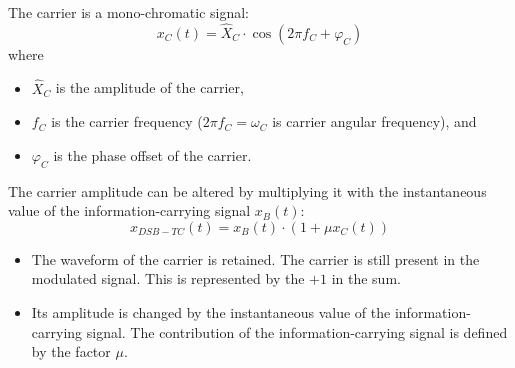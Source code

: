 \begin{refsection}
The carrier is a mono-chromatic signal:
\begin{equation}
	x_C(t) = \hat{X}_C \cdot \cos\left(2\pi f_C + \varphi_C\right)
\end{equation}
where
\begin{itemize}
	\item $\hat{X}_C$ is the amplitude of the carrier,
	\item $f_C$ is the carrier frequency ($2\pi f_C = \omega_C$ is carrier angular frequency), and
	\item $\varphi_C$ is the phase offset of the carrier.
\end{itemize}

The carrier amplitude can be altered by multiplying it with the instantaneous value of the information-carrying signal $x_B(t)$:
\begin{equation}
	x_{DSB-TC}(t) = x_B(t) \cdot \left(1 + \mu x_C(t)\right)
	\label{eq:ch05:amdsb_timedomain}
\end{equation}
\begin{itemize}
	\item The waveform of the carrier is retained. The carrier is still present in the modulated signal. This is represented by the $+1$ in the sum.
	\item Its amplitude is changed by the instantaneous value of the information-carrying signal. The contribution of the information-carrying signal is defined by the factor $\mu$.
\end{itemize}

\begin{figure}[H]
	\centering
	


\end{figure}
\end{refsection}
